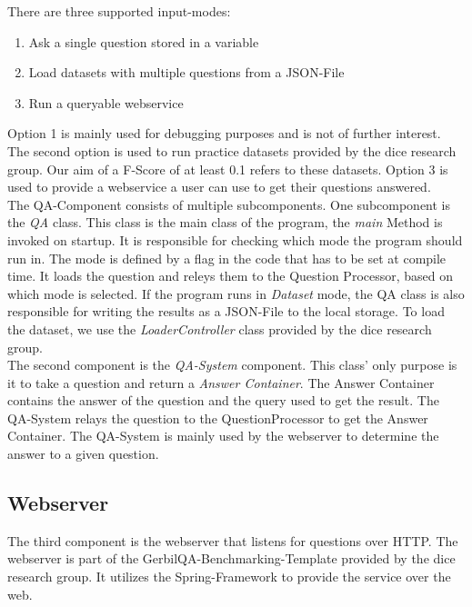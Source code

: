 \documentclass[runningheads]{llncs}
\begin{document}
There are three supported input-modes:  

\begin{enumerate}
	\item Ask a single question stored in a variable
	\item Load datasets with multiple questions from a JSON-File 
	\item Run a queryable webservice 
\end{enumerate}

Option 1 is mainly used for debugging purposes and is not of further interest. The second option is used to run practice datasets provided by the dice research group. Our aim of a F-Score of at least 0.1 refers to these datasets. Option 3 is used to provide a webservice a user can use to get their questions answered. \\

The QA-Component consists of multiple subcomponents. One subcomponent is the \emph{QA} class. This class is the main class of the program, the \emph{main} Method is invoked on startup. It is responsible for checking which mode the program should run in. The mode is defined by a flag in the code that has to be set at compile time. It loads the question and releys them to the Question Processor, based on which mode is selected. If the program runs in \emph{Dataset} mode, the QA class is also responsible for writing the results as a JSON-File to the local storage. To load the dataset, we use the \emph{LoaderController} class provided by the dice research group. \\

The second component is the \emph{QA-System} component. This class' only purpose is it to take a question and return a \emph{Answer Container}. The Answer Container contains the answer of the question and the query used to get the result. The QA-System relays the question to the QuestionProcessor to get the Answer Container. The QA-System is mainly used by the webserver to determine the answer to a given question. \\

\subsection{Webserver}

The third component is the webserver that listens for questions over HTTP. The webserver is part of the GerbilQA-Benchmarking-Template provided by the dice research group. It utilizes the Spring-Framework to provide the service over the web. \\
\end{document}
